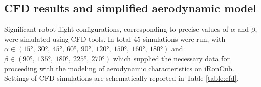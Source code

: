 
\subsection{CFD results and simplified aerodynamic model}\label{sec:aeroModel}

Significant robot flight configurations, corresponding to precise values of $\alpha$ and $\beta$, were simulated using CFD tools. In total 45 simulations were run, with $ \alpha \in (\ang{15},\ \ang{30},\ \ang{45},\ \ang{60},\ \ang{90},\ \ang{120},\ \ang{150},\ \ang{160},\ \ang{180})$ and $ \beta \in (\ang{90},\ \ang{135},\ \ang{180},\ \ang{225},\ \ang{270})$ which supplied the necessary data for proceeding with the modeling of aerodynamic characteristics on iRonCub. Settings of CFD simulations are schematically reported in Table \ref{table:cfd}.
 
 

